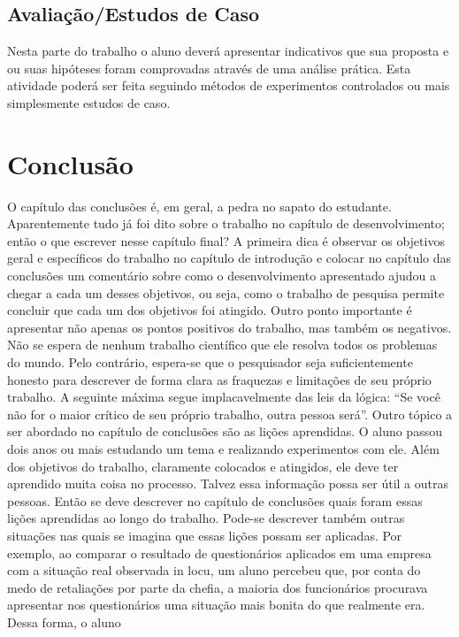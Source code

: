 \documentclass[
	12pt,				%
    oneside,			%
	a4paper,			%
	english,			%
	french,				%
	spanish,			%
	brazil,				%
	]{abntex2}
\begin{document}
\section{Avaliação/Estudos de Caso}

Nesta parte do trabalho o aluno deverá apresentar indicativos que sua proposta e ou suas hipóteses foram comprovadas através de uma análise prática. Esta atividade poderá ser feita seguindo métodos de experimentos controlados ou mais simplesmente estudos de caso.


\chapter{Conclusão}

O capítulo das conclusões é, em geral, a pedra no sapato do estudante. Aparentemente tudo já foi dito sobre o
trabalho no capítulo de desenvolvimento; então o que escrever nesse capítulo final?
A primeira dica é observar os objetivos geral e específicos do trabalho no capítulo de introdução e colocar no
capítulo das conclusões um comentário sobre como o desenvolvimento apresentado ajudou a chegar a cada um
desses objetivos, ou seja, como o trabalho de pesquisa permite concluir que cada um dos objetivos foi atingido.
Outro ponto importante é apresentar não apenas os pontos positivos do trabalho, mas também os negativos.
Não se espera de nenhum trabalho científico que ele resolva todos os problemas do mundo. Pelo contrário,
espera-se que o pesquisador seja suficientemente honesto para descrever de forma clara as fraquezas e
limitações de seu próprio trabalho.
A seguinte máxima segue implacavelmente das leis da lógica: “Se você não for o maior crítico de seu próprio
trabalho, outra pessoa será”.
Outro tópico a ser abordado no capítulo de conclusões são as lições aprendidas. O aluno passou dois anos ou
mais estudando um tema e realizando experimentos com ele. Além dos objetivos do trabalho, claramente
colocados e atingidos, ele deve ter aprendido muita coisa no processo. Talvez essa informação possa ser útil a
outras pessoas. Então se deve descrever no capítulo de conclusões quais foram essas lições aprendidas ao longo
do trabalho.
Pode-se descrever também outras situações nas quais se imagina que essas lições possam ser aplicadas. Por
exemplo, ao comparar o resultado de questionários aplicados em uma empresa com a situação real observada in
locu, um aluno percebeu que, por conta do medo de retaliações por parte da chefia, a maioria dos funcionários
procurava apresentar nos questionários uma situação mais bonita do que realmente era. Dessa forma, o aluno
\end{document}
